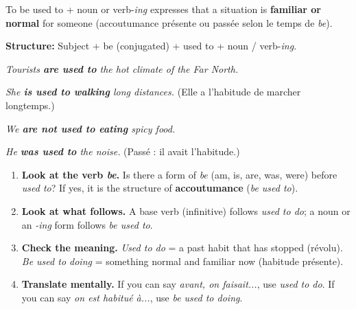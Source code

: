 \documentclass[11pt]{article}
\newcommand{\cle}[1]{{\popxbold\color{popdark}#1}}
\begin{document}
\begin{definition}
\cle{To be used to} + noun or verb-\emph{ing} expresses that a situation is \textbf{familiar or normal} for someone (accoutumance présente ou passée selon le temps de \emph{be}).\par
\textbf{Structure:} Subject + be (conjugated) + used to + noun / verb-\emph{ing}.\par
\emph{Tourists \textbf{are used to} the hot climate of the Far North.}\par
\emph{She \textbf{is used to walking} long distances.} (Elle a l'habitude de marcher longtemps.)\par
\emph{We \textbf{are not used to eating} spicy food.}\par
\emph{He \textbf{was used to} the noise.} (Passé : il avait l'habitude.)
\end{definition}

\begin{methode}
\begin{enumerate}
\item \textbf{Look at the verb \emph{be}.} Is there a form of \emph{be} (am, is, are, was, were) before \emph{used to}? If yes, it is the structure of \textbf{accoutumance} (\emph{be used to}).
\item \textbf{Look at what follows.} A base verb (infinitive) follows \emph{used to do}; a noun or an \emph{-ing} form follows \emph{be used to}.
\item \textbf{Check the meaning.} \emph{Used to do} = a past habit that has stopped (révolu). \emph{Be used to doing} = something normal and familiar now (habitude présente).
\item \textbf{Translate mentally.} If you can say \emph{avant, on faisait...}, use \emph{used to do}. If you can say \emph{on est habitué à...}, use \emph{be used to doing}.
\end{enumerate}
\end{methode}
\end{document}
